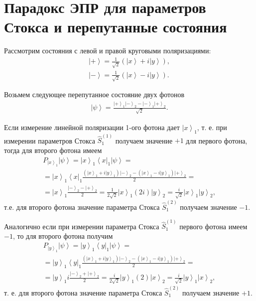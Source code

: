 \section{Парадокс ЭПР для параметров
  Стокса и перепутанные состояния}

Рассмотрим состояния с левой и правой круговыми поляризациями:
\begin{eqnarray}
  \left| + \right> = \frac{1}{\sqrt{2}}
  \left(
  \left|x\right> + i \left|y\right>
  \right),
  \nonumber \\
  \left| - \right> = \frac{1}{\sqrt{2}}
  \left(
  \left|x\right> - i \left|y\right>
  \right).
  \nonumber
\end{eqnarray}

Возьмем следующее перепутанное состояние двух фотонов
\begin{eqnarray}
  \left|\psi\right> = \frac{
    \left| + \right>_1\left| - \right>_2 -
    \left| - \right>_1\left| + \right>_2
  }{\sqrt{2}}.
  \nonumber
\end{eqnarray}

Если измерение линейной поляризации 1-ого фотона дает
$\left|x\right>_1$, т. е. при измерении параметров Стокса
$\hat{S}_1^{(1)}$ получаем значение $+1$ для первого фотона, тогда для
второго фотона имеем
\begin{eqnarray}
  P_{\left|x\right>_1}\left|\psi\right> =
  \left|x\right>_1\left<x\right|_1 \left|\psi\right> =
  \nonumber \\
  =
  \left|x\right>_1\left<x\right|_1
  \frac{
    \left( \left|x\right>_1 + i \left|y\right>_1 \right)\left| - \right>_2 -
    \left( \left|x\right>_1 - i \left|y\right>_1 \right)\left| + \right>_2
  }{2} =
  \nonumber \\
  =
  \left|x\right>_1
  \frac{\left| - \right>_2 - \left| + \right>_2}{2} =
  \frac{1}{2\sqrt{2}}\left|x\right>_1 \left(2 i\right)
  \left|y\right>_2 =
  \frac{i}{\sqrt{2}}\left|x\right>_1\left|y\right>_2,
  \nonumber
\end{eqnarray}
т.е. для второго фотона значение параметра Стокса 
$\hat{S}_1^{(2)}$ получаем значение $-1$.

Аналогично если при измерении параметра Стокса $\hat{S}_1^{(1)}$
первого фотона имеем $-1$, то для второго фотона получим
\begin{eqnarray}
  P_{\left|y\right>_1}\left|\psi\right> =
  \left|y\right>_1\left<y\right|_1 \left|\psi\right> =
  \nonumber \\
  =
  \left|y\right>_1\left<y\right|_1
  \frac{
    \left( \left|x\right>_1 + i \left|y\right>_1 \right)\left| - \right>_2 -
    \left( \left|x\right>_1 - i \left|y\right>_1 \right)\left| + \right>_2
  }{2} =
  \nonumber \\
  =
  \left|y\right>_1 i 
  \frac{\left| - \right>_2 + \left| + \right>_2}{2} =
  \frac{i}{2\sqrt{2}}\left|y\right>_1 \left(2\right)
  \left|x\right>_2 =
  \frac{i}{\sqrt{2}}\left|y\right>_1\left|x\right>_2,
  \nonumber
\end{eqnarray}
т. е. для второго фотона значение параметра Стокса 
$\hat{S}_1^{(2)}$ получаем значение $+1$.

